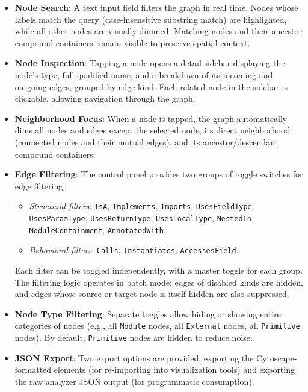 \begin{itemize}
  \item \textbf{Node Search}: A text input field filters the graph in
    real time. Nodes whose labels match the query (case-insensitive
    substring match) are highlighted, while all other nodes are
    visually dimmed. Matching nodes and their ancestor compound
    containers remain visible to preserve spatial context.
  \item \textbf{Node Inspection}: Tapping a node opens a detail
    sidebar displaying the node's type, full qualified name, and a
    breakdown of its incoming and outgoing edges, grouped by edge
    kind. Each related node in the sidebar is clickable, allowing
    navigation through the graph.
  \item \textbf{Neighborhood Focus}: When a node is tapped, the graph
    automatically dims all nodes and edges except the selected node,
    its direct neighborhood (connected nodes and their mutual edges),
    and its ancestor/descendant compound containers.
  \item \textbf{Edge Filtering}: The control panel provides two
    groups of toggle switches for edge filtering:
    \begin{itemize}
      \item \textit{Structural filters}: \texttt{IsA},
        \texttt{Implements}, \texttt{Imports},
        \texttt{UsesFieldType},\\ \texttt{UsesParamType},
        \texttt{UsesReturnType}, \texttt{UsesLocalType},
        \texttt{NestedIn}, \\ \texttt{ModuleContainment},
        \texttt{AnnotatedWith}.
      \item \textit{Behavioral filters}: \texttt{Calls},
        \texttt{Instantiates}, \texttt{AccessesField}.
    \end{itemize}
    Each filter can be toggled independently, with a master toggle
    for each group. The filtering logic operates in batch mode: edges
    of disabled kinds are hidden, and edges whose source or target
    node is itself hidden are also suppressed.
  \item \textbf{Node Type Filtering}: Separate toggles allow hiding
    or showing entire categories of nodes (e.g., all \texttt{Module}
      nodes, all \texttt{External} nodes, all \texttt{Primitive}
    nodes). By default, \texttt{Primitive} nodes are hidden to reduce noise.
  \item \textbf{JSON Export}: Two export options are provided:
    exporting the Cyto\-scape-formatted elements (for re-importing into
    visualization tools) and exporting the raw analyzer JSON output
    (for programmatic consumption).
\end{itemize}
